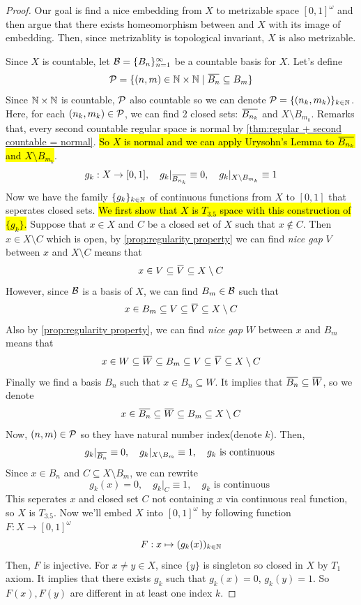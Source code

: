 \documentclass[12pt, a4paper, twoside]{article}
\newcommand{\overbar}[1]{\mkern 1.5mu\overline{\mkern-1.5mu#1\mkern-1.5mu}\mkern 1.5mu}
\theoremstyle{plain}
\begin{document}
\begin{proof}
    Our goal is find a nice embedding from $X$ to metrizable space $[0,1]^\omega$ and then argue that 
    there exists homeomorphism between and $X$ with its image of embedding. Then, since metrizablity is 
    topological invariant, $X$ is also metrizable. 

    Since $X$ is countable, let ${\mathcal {B}} = \{B_n\}_{n = 1}^{\infty}$ be a 
    countable basis for $X$. Let's define 
    \[\CP = \{(n, m) \in \BN \times \BN \mid \overbar{B_n} \subseteq B_m\}\]
    Since ${\mathbb {N}} \times {\mathbb {N}}$ is countable, ${\mathcal {P}}$ also countable so we can denote ${\mathcal {P}} = \{(n_k, m_k)\}_{k \in {\mathbb {N}}}$. 
    Here, for each $(n_k, m_k) \in {\mathcal {P}}$, we can find 2 closed sets: $\overbar{B_{n_k}}$ and $X \setminus B_{m_k}$. 
    Remarks that, every second countable regular space is normal by \ref{thm:regular + second countable = normal}. 
    \hl{So $X$ is normal and we can apply Urysohn's Lemma to $\overbar{B_{n_k}}$ and $X \setminus B_{m_k}$}. 
    \[g_k: X \rightarrow [0,1] , \quad g_k|_{\overbar{B_{n_k}}} \equiv 0, \quad g_k|_{X \setminus B_{m_k}} \equiv 1\]
    Now we have the family $\{g_k\}_{k \in {\mathbb {N}}}$ of continuous functions from $X$ to $[0,1]$ that seperates closed sets. 
    \hl{We first show that $X$ is $T_{3.5}$ space with this construction of $\{g_k\}$.} 
    Suppose that $x \in X$ and $C$ be a closed set of $X$ such that $x \notin C$. 
    Then $x \in X \setminus C$ which is open, by \ref{prop:regularity property} we can find \textit{nice gap} $V$ between $x$ and $X \setminus C$ means that 
    \[x \in V \subseteq \overbar{V} \subseteq X \setminus C\]
    However, since ${\mathcal {B}}$ is a basis of $X$, we can find $B_m \in {\mathcal {B}}$ such that 
    \[x \in B_m \subseteq V \subseteq \overbar{V} \subseteq X \setminus C\]
    Also by \ref{prop:regularity property}, we can find \textit{nice gap} $W$ between $x$ and $B_m$ means that  
    \[x \in W \subseteq \overbar{W} \subseteq B_m \subseteq V \subseteq \overbar{V} \subseteq X \setminus C\]
    Finally we find a basis $B_n$ such that $x \in B_n \subseteq W$. It implies that $\overbar{B_n} \subseteq \overbar{W}$, so we denote 
    \[x \in \overbar{B_n} \subseteq \overbar{W} \subseteq B_m \subseteq X \setminus C\]
    Now, $(n, m) \in {\mathcal {P}}$ so they have natural number index(denote $k$). 
    Then, 
    \[g_k|_{\overbar{B_n}} \equiv 0, \quad g_k|_{X \setminus B_m} \equiv 1, \quad g_k \text{ is continuous }\]
    Since $x \in B_n$ and $C \subseteq X \setminus B_m$, we can rewrite  
    \[g_k(x) = 0, \quad g_k|_{C} \equiv 1, \quad g_k \text{ is continuous }\]
    This seperates $x$ and closed set $C$ not containing $x$ via continuous real function, so $X$ is $T_{3.5}$. 
    Now we'll embed $X$ into $[0,1]^\omega$ by following function $F: X \rightarrow [0,1]^\omega$ 
    \[F: x \mapsto (g_k(x))_{k \in {\mathbb {N}}}\]
    Then, $F$ is injective. For $x \neq y \in X$, since $\{y\}$ is singleton so closed in $X$ by $T_1$ axiom. 
    It implies that there exists $g_k$ such that $g_k(x) = 0$, $g_k(y) = 1$. So $F(x), F(y)$ are 
    different in at least one index $k$. 


\end{proof}
\end{document}
